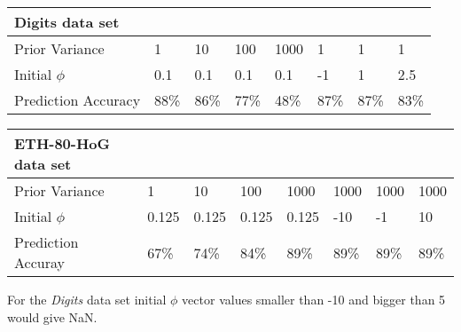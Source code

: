 \documentclass[12pt]{article}
\begin{document}
\begin{table}[h]
\begin{tabular}{l|lllllll}
Digits data set &  &  &  &  &  &  &  \\ \hline
Prior Variance & \multicolumn{1}{l|}{1} & \multicolumn{1}{l|}{10} & \multicolumn{1}{l|}{100} & \multicolumn{1}{l|}{1000} & \multicolumn{1}{l|}{1} & \multicolumn{1}{l|}{1} & \multicolumn{1}{l|}{1} \\ \hline
Initial $\phi$ & \multicolumn{1}{l|}{0.1} & \multicolumn{1}{l|}{0.1} & \multicolumn{1}{l|}{0.1} & \multicolumn{1}{l|}{0.1} & \multicolumn{1}{l|}{-1} & \multicolumn{1}{l|}{1} & \multicolumn{1}{l|}{2.5} \\ \hline
Prediction Accuracy & \multicolumn{1}{l|}{88\%} & \multicolumn{1}{l|}{86\%} & \multicolumn{1}{l|}{77\%} & \multicolumn{1}{l|}{48\%} & \multicolumn{1}{l|}{87\%} & \multicolumn{1}{l|}{87\%} & \multicolumn{1}{l|}{83\%} \\ \hline
\end{tabular}
\end{table}

\begin{table}[h]
\begin{tabular}{l|lllllll}
ETH-80-HoG data set &  &  &  &  &  &  &  \\ \hline
Prior Variance & \multicolumn{1}{l|}{1} & \multicolumn{1}{l|}{10} & \multicolumn{1}{l|}{100} & \multicolumn{1}{l|}{1000} & \multicolumn{1}{l|}{1000} & \multicolumn{1}{l|}{1000} & \multicolumn{1}{l|}{1000} \\ \hline
Initial $\phi$ & \multicolumn{1}{l|}{0.125} & \multicolumn{1}{l|}{0.125} & \multicolumn{1}{l|}{0.125} & \multicolumn{1}{l|}{0.125} & \multicolumn{1}{l|}{-10} & \multicolumn{1}{l|}{-1} & \multicolumn{1}{l|}{10} \\ \hline
Prediction Accuray & \multicolumn{1}{l|}{67\%} & \multicolumn{1}{l|}{74\%} & \multicolumn{1}{l|}{84\%} & \multicolumn{1}{l|}{89\%} & \multicolumn{1}{l|}{89\%} & \multicolumn{1}{l|}{89\%} & \multicolumn{1}{l|}{89\%} \\ \hline
\end{tabular}
\end{table}

For the \textit{Digits} data set initial $\phi$ vector values smaller than -10 and bigger than 5 would give NaN. 
 
\end{document}
